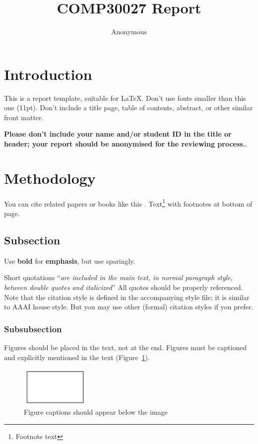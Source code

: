 \documentclass[11pt]{article}
\title{COMP30027 Report}
\author
{Anonymous}
\begin{document}
\maketitle



\section{Introduction}

This is a report template, suitable for \LaTeX. Don't use fonts smaller than this one (11pt). Don't include a title page,
table of contents, abstract, or other similar front matter.

\textbf{Please don't include your name and/or student ID in the title or header; your report should be anonymised for the reviewing process.}.


\section{Methodology}

You can cite related papers or books like this \cite{bishop2006pattern}. Text\footnote{Footnote text} with footnotes at bottom of page.

\subsection{Subsection}

Use \textbf{bold} for \textbf{emphasis}, but use sparingly. 

Short quotations ``\textit{are included in the main text, in normal paragraph style, between double quotes and italicized}'' All quotes should be properly referenced. Note that the citation style is defined in the accompanying
style file; it is similar to AAAI house style. But you may use other (formal) citation styles if you prefer.

\subsubsection{Subsubsection}

Figures should be placed in the text, not at the end. Figures must be captioned and explicitly mentioned in the text (Figure~\ref{fig:sample}). 
\begin{figure}[!h]
	\centering
	\includegraphics[width = 0.3\textwidth]{sample-figure.png}
	\caption{Figure captions should appear below the image}
	\label{fig:sample}
\end{figure}
\end{document}
